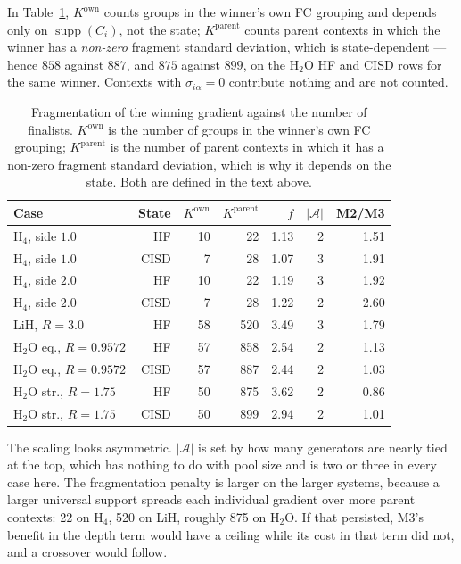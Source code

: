 \documentclass[10pt]{article}
\newcommand{\supp}{\operatorname{supp}}
\begin{document}
In Table~\ref{tab:frag}, $K^{\text{own}}$ counts groups in the winner's own FC
grouping and depends only on $\supp(C_i)$, not the state; $K^{\text{parent}}$
counts parent contexts in which the winner has a \emph{non-zero} fragment
standard deviation, which is state-dependent --- hence $858$ against $887$, and
$875$ against $899$, on the H$_2$O HF and CISD rows for the same winner. Contexts
with $\sigma_{i\alpha}=0$ contribute nothing and are not counted.

\begin{table}[!htbp]
\centering
\scriptsize
\caption{Fragmentation of the winning gradient against the number of finalists. $K^{\text{own}}$ is the number of groups in the winner's own FC grouping; $K^{\text{parent}}$ is the number of parent contexts in which it has a non-zero fragment standard deviation, which is why it depends on the state. Both are defined in the text above.}
\label{tab:frag}
\begin{tabular}{lrrrrrr}
\toprule
Case & State & $K^{\text{own}}$ & $K^{\text{parent}}$ & $f$ & $|\mathcal A|$ & M2/M3 \\
\midrule
H$_4$, side $1.0$ & HF & 10 & 22 & 1.13 & 2 & 1.51 \\
H$_4$, side $1.0$ & CISD & 7 & 28 & 1.07 & 3 & 1.91 \\
H$_4$, side $2.0$ & HF & 10 & 22 & 1.19 & 3 & 1.92 \\
H$_4$, side $2.0$ & CISD & 7 & 28 & 1.22 & 2 & 2.60 \\
LiH, $R{=}3.0$ & HF & 58 & 520 & 3.49 & 3 & 1.79 \\
H$_2$O eq., $R{=}0.9572$ & HF & 57 & 858 & 2.54 & 2 & 1.13 \\
H$_2$O eq., $R{=}0.9572$ & CISD & 57 & 887 & 2.44 & 2 & 1.03 \\
H$_2$O str., $R{=}1.75$ & HF & 50 & 875 & 3.62 & 2 & 0.86 \\
H$_2$O str., $R{=}1.75$ & CISD & 50 & 899 & 2.94 & 2 & 1.01 \\
\bottomrule
\end{tabular}
\end{table}

The scaling looks asymmetric. $|\mathcal A|$ is set by how many generators are nearly tied at the top, which has nothing to do with pool size and is two or three in every case here. The fragmentation penalty is larger on the larger systems, because a larger universal support spreads each individual gradient over more parent contexts: 22 on H$_4$, 520 on LiH, roughly 875 on H$_2$O. If that persisted, M3's benefit in the depth term would have a ceiling while its cost in that term did not, and a crossover would follow.
\end{document}
